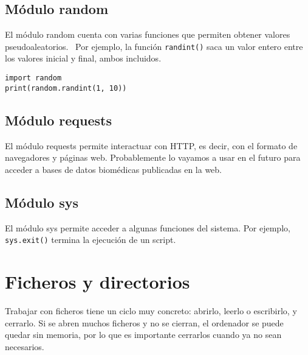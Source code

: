 \subsection{Módulo random}
El módulo random cuenta con varias funciones que permiten obtener valores pseudoaleatorios.   \ Por ejemplo, la función \texttt{randint()} saca un valor entero entre los valores inicial y final, ambos incluidos. 
\begin{lstlisting}
import random
print(random.randint(1, 10)) 
\end{lstlisting}

\subsection{Módulo requests}
El módulo requests permite interactuar con HTTP, es decir, con el formato de navegadores y páginas web. Probablemente lo vayamos a usar en el futuro para acceder a bases de datos biomédicas publicadas en la web. 

\subsection{Módulo sys}
El módulo sys permite acceder a algunas funciones del sistema. Por ejemplo, \texttt{sys.exit()} termina la ejecución de un script.

\section{Ficheros y directorios}
Trabajar con ficheros tiene un ciclo muy concreto: abrirlo, leerlo o escribirlo, y cerrarlo. Si se abren muchos ficheros y no se cierran, el ordenador se puede quedar sin memoria, por lo que es importante cerrarlos cuando ya no sean necesarios. 

